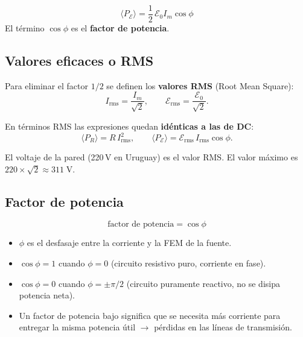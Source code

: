 \documentclass[12pt,a4paper]{article}
\begin{document}
\begin{keybox}
\[
\boxed{\langle P_{\mathcal{E}} \rangle
      = \frac12\, \mathcal{E}_0 I_m \cos\phi}
\]
El término \(\cos\phi\) es el \textbf{factor de potencia}.
\end{keybox}

\subsection{Valores eficaces o RMS}

Para eliminar el factor \(1/2\) se definen los
\textbf{valores RMS} (Root Mean Square):
\[
\boxed{I_{\text{rms}} = \frac{I_m}{\sqrt{2}}},\qquad
\boxed{\mathcal{E}_{\text{rms}} = \frac{\mathcal{E}_0}{\sqrt{2}}}.
\]

En términos RMS las expresiones quedan \textbf{idénticas a las de DC}:
\[
\boxed{\langle P_R \rangle = R\, I_{\text{rms}}^2},\qquad
\boxed{\langle P_{\mathcal{E}} \rangle
      = \mathcal{E}_{\text{rms}}\, I_{\text{rms}} \cos\phi}.
\]

\begin{notebox}[Ejemplo]
  El voltaje de la pared (220\,V en Uruguay) es el valor RMS. El
  valor máximo es \(220 \times \sqrt{2} \approx 311\;\text{V}\).
\end{notebox}

\subsection{Factor de potencia}

\[
\boxed{\text{factor de potencia} = \cos\phi}
\]

\begin{itemize}
  \item \(\phi\) es el desfasaje entre la corriente y la FEM de la
        fuente.
  \item \(\cos\phi = 1\) cuando \(\phi = 0\) (circuito resistivo puro,
        corriente en fase).
  \item \(\cos\phi = 0\) cuando \(\phi = \pm \pi/2\) (circuito
        puramente reactivo, no se disipa potencia neta).
  \item Un factor de potencia bajo significa que se necesita más
        corriente para entregar la misma potencia útil
        \(\rightarrow\) pérdidas en las líneas de transmisión.
\end{itemize}
\end{document}
